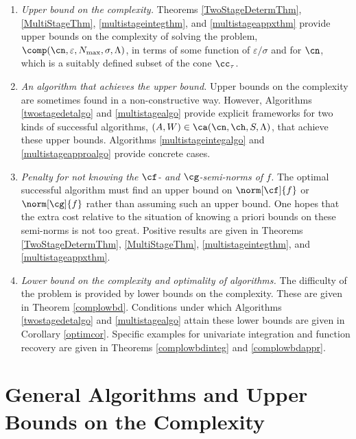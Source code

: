 \documentclass[]{elsarticle}
\theoremstyle{definition}
\theoremstyle{remark}
\begin{document}
\begin{enumerate}

\renewcommand{\labelenumi}{\roman{enumi}.}

\item \emph{Upper bound on the complexity.}
Theorems \ref{TwoStageDetermThm}, \ref{MultiStageThm}, \ref{multistageintegthm}, and \ref{multistageappxthm} provide upper bounds on the complexity of solving the problem, $\comp(\cn,\varepsilon,N_{\max},\sigma,\Lambda)$, in terms of some function of $\varepsilon/\sigma$ and for $\cn$, which is a suitably defined subset of the cone $\cc_{\tau}$.

\item \emph{An algorithm that achieves the upper bound.}  Upper bounds on the complexity are sometimes found in a non-constructive way.  However, Algorithms \ref{twostagedetalgo} and \ref{multistagealgo} provide explicit frameworks for two kinds of successful algorithms, $(A,W) \in \ca(\cn,\ch,S,\Lambda)$, that achieve these upper bounds.  Algorithms \ref{multistageintegalgo} and \ref{multistageapproalgo} provide concrete cases.

\item \emph{Penalty for not knowing the $\cf$- and $\cg$-semi-norms of $f$.} The optimal successful algorithm must find an upper bound on $\norm[\cf]{f}$ or $\norm[\cg]{f}$ rather than assuming such an upper bound.  One hopes that the extra cost relative to the situation of knowing a priori bounds on these semi-norms is not too great.  Positive results are given in Theorems  \ref{TwoStageDetermThm}, \ref{MultiStageThm}, \ref{multistageintegthm}, and \ref{multistageappxthm}.

\item \emph{Lower bound on the complexity and optimality of algorithms.}  The difficulty of the problem is provided by lower bounds on the complexity.  These are given in Theorem \ref{complowbd}.  Conditions under which Algorithms \ref{twostagedetalgo} and \ref{multistagealgo} attain these lower bounds are given in Corollary \ref{optimcor}.  Specific examples for univariate integration and function recovery are given in Theorems \ref{complowbdinteg} and \ref{complowbdappr}.

\end{enumerate}

\section{General Algorithms and Upper Bounds on the Complexity} \label{genthmsec}
\end{document}
